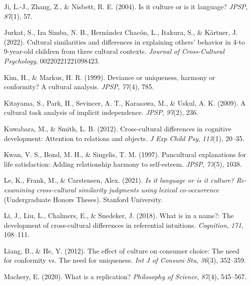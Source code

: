 \documentclass[
  man,floatsintext]{apa6}
\newlength{\cslhangindent}
\newlength{\cslentryspacingunit} %
\newenvironment{CSLReferences}[2] %
 {%
  \setlength{\parindent}{0pt}
  \ifodd #1
  \let\oldpar\par
  \def\par{\hangindent=\cslhangindent\oldpar}
  \fi
  \setlength{\parskip}{#2\cslentryspacingunit}
 }%
 {}
\begin{document}
\begin{CSLReferences}{1}{0}
\leavevmode{}%
Ji, L.-J., Zhang, Z., \& Nisbett, R. E. (2004). Is it culture or is it language? \emph{JPSP}, \emph{87}(1), 57.

\leavevmode{}%
Jurkat, S., Iza Simba, N. B., Hernández Chacón, L., Itakura, S., \& Kärtner, J. (2022). Cultural similarities and differences in explaining others' behavior in 4-to 9-year-old children from three cultural contexts. \emph{Journal of Cross-Cultural Psychology}, 00220221221098423.

\leavevmode{}%
Kim, H., \& Markus, H. R. (1999). Deviance or uniqueness, harmony or conformity? A cultural analysis. \emph{JPSP}, \emph{77}(4), 785.

\leavevmode{}%
Kitayama, S., Park, H., Sevincer, A. T., Karasawa, M., \& Uskul, A. K. (2009). A cultural task analysis of implicit independence. \emph{JPSP}, \emph{97}(2), 236.

\leavevmode{}%
Kuwabara, M., \& Smith, L. B. (2012). Cross-cultural differences in cognitive development: Attention to relations and objects. \emph{J Exp Child Psy}, \emph{113}(1), 20--35.

\leavevmode{}%
Kwan, V. S., Bond, M. H., \& Singelis, T. M. (1997). Pancultural explanations for life satisfaction: Adding relationship harmony to self-esteem. \emph{JPSP}, \emph{73}(5), 1038.

\leavevmode{}%
Le, K., Frank, M., \& Carstensen, Alex. (2021). \emph{Is it language or is it culture? Re-examining cross-cultural similarity judgments using lexical co-occurrence} (Undergraduate Honors Theses). Stanford University.

\leavevmode{}%
Li, J., Liu, L., Chalmers, E., \& Snedeker, J. (2018). What is in a name?: The development of cross-cultural differences in referential intuitions. \emph{Cognition}, \emph{171}, 108--111.

\leavevmode{}%
Liang, B., \& He, Y. (2012). The effect of culture on consumer choice: The need for conformity vs. The need for uniqueness. \emph{Int J of Consum Stu}, \emph{36}(3), 352--359.

\leavevmode{}%
Machery, E. (2020). What is a replication? \emph{Philosophy of Science}, \emph{87}(4), 545--567.


\end{CSLReferences}
\end{document}
